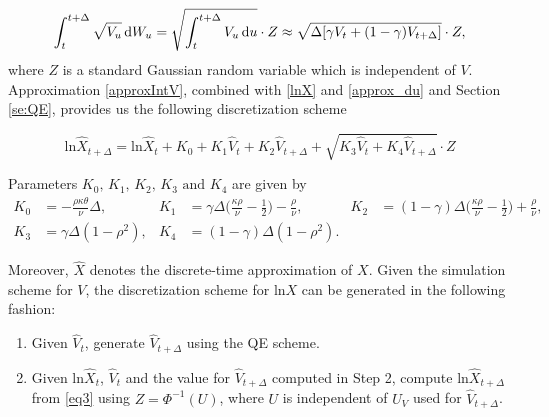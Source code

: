 \documentclass{ws-ijfe}
\begin{document}
\begin{equation}\label{approxIntV}
  \int_{t}^{t+\Delta}\sqrt{V_u}\,\d W_u=\sqrt{ \int_{t}^{t+\Delta}V_u\,\d u }\cdot Z\approx \sqrt{\Delta[\gamma V_t+(1-\gamma)V_{t+\Delta}]}\cdot Z,
\end{equation}
where $Z$ is a standard Gaussian random variable which is independent of ${V}$. Approximation \eqref{approxIntV}, combined with \eqref{lnX} and \eqref{approx_du} and Section \ref{se:QE}, provides us the following discretization scheme



\begin{equation}\label{eq3}
  \text{ln}\hat{X}_{t+\Delta}=\text{ln}\hat{X}_t+K_0+K_1\hat{V}_t+K_2\hat{V}_{t+\Delta}+\sqrt{K_3\hat{V}_t+K_4\hat{V}_{t+\Delta}}\cdot Z
\end{equation}

Parameters $K_0\text{, }K_1\text{, }K_2\text{, }K_3\text{ and }K_4$ are given by
\begin{align*}
  K_0&=-\frac{\rho\kappa\theta}{\nu}\Delta, &
  K_1&=\gamma\Delta\bigg(\frac{\kappa\rho}{\nu}-\frac{1}{2}\bigg)-\frac{\rho}{\nu}, &  K_2&=(1-\gamma)\Delta\bigg(\frac{\kappa\rho}{\nu}-\frac{1}{2}\bigg)+\frac{\rho}{\nu}, \\ K_3&=\gamma\Delta(1-\rho^2), & K_4&=(1-\gamma)\Delta(1-\rho^2).
\end{align*}

Moreover, $\hat{X}$ denotes the discrete-time approximation of $X$. Given the simulation scheme for $V$, the discretization scheme for ln$X$ can be generated in the following fashion:
\begin{enumerate}
  \item Given $\hat{V}_t$, generate $\hat{V}_{t+\Delta}$ using the QE scheme.
  \item Given ln$\hat{X}_t$, $\hat{V}_t$ and the value for $\hat{V}_{t+\Delta}$ computed in Step 2, compute ln$\hat{X}_{t+\Delta}$ from \eqref{eq3} using $Z=\Phi^{-1}(U)$, where $U$ is independent of $U_V$ used for $\hat{V}_{t+\Delta}$.
\end{enumerate}
\end{document}
